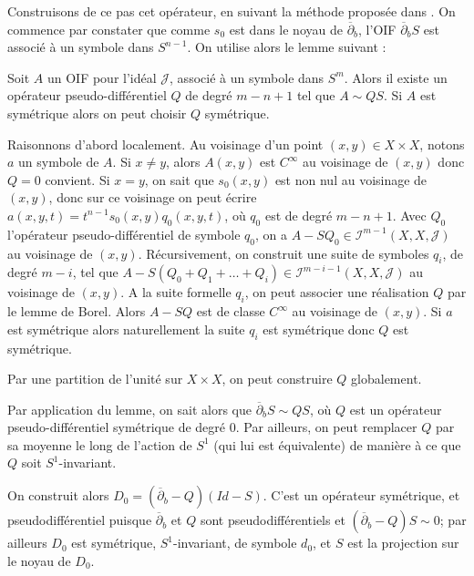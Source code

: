 Construisons de ce pas cet opérateur, en suivant la méthode proposée
dans \cite{BoutetdeMonvel1981}. On commence par constater que comme
$s_0$ est dans le noyau de $\overline{\partial}_b$, l'OIF
$\overline{\partial}_b S$ est associé à un symbole dans $S^{n-1}$. On utilise alors le lemme suivant :

\begin{lem}
	Soit $A$ un OIF pour l'idéal $\mathcal{J}$, associé à un
        symbole dans $S^m$. Alors il existe un opérateur pseudo-différentiel $Q$ de degré $m-n+1$ tel que $A \sim QS$. Si $A$ est symétrique alors on peut choisir $Q$ symétrique.
\end{lem}
\begin{preuve}
	Raisonnons d'abord localement. Au voisinage d'un point $(x,y) \in X\times X$, notons $a$ un symbole de $A$. Si $x \neq y$, alors $A(x,y)$ est $C^{\infty}$ au voisinage de $(x,y)$ donc $Q=0$ convient. Si $x=y$, on sait que $s_0(x,y)$ est non nul au voisinage de $(x,y)$, donc sur ce voisinage on peut écrire $a(x,y,t)=t^{n-1}s_0(x,y)q_0(x,y,t)$, où $q_0$ est de degré $m-n+1$. Avec $Q_0$ l'opérateur pseudo-différentiel de symbole $q_0$, on a $A-SQ_0 \in \mathcal{I}^{m-1}(X,X,\mathcal{J})$ au voisinage de $(x,y)$. Récursivement, on construit une suite de symboles $q_i$, de degré $m-i$, tel que $A-S(Q_0+Q_1+\ldots + Q_i) \in \mathcal{I}^{m-i-1}(X,X,\mathcal{J})$ au voisinage de $(x,y)$. A la suite formelle $q_i$, on peut associer une réalisation $Q$ par le lemme de Borel. Alors $A-SQ$ est de classe $C^{\infty}$ au voisinage de $(x,y)$. Si $a$ est symétrique alors naturellement la suite $q_i$ est symétrique donc $Q$ est symétrique.
	
	Par une partition de l'unité sur $X \times X$, on peut construire $Q$ globalement.
\end{preuve}

Par application du lemme, on sait alors que $\overline{\partial}_b S \sim QS$, où $Q$ est un opérateur pseudo-différentiel symétrique de degré $0$. Par ailleurs, on peut remplacer $Q$ par sa moyenne le long de l'action de $S^1$ (qui lui est équivalente) de manière à ce que $Q$ soit $S^1$-invariant.

On construit alors $D_0 = (\overline{\partial}_b - Q)(Id-S)$. C'est un opérateur symétrique, et pseudodifférentiel puisque $\overline{\partial}_b$ et $Q$ sont pseudodifférentiels et $(\overline{\partial}_b-Q)S \sim 0$; par ailleurs $D_0$ est symétrique, $S^1$-invariant, de symbole $d_0$, et $S$ est la projection sur le noyau de $D_0$.

